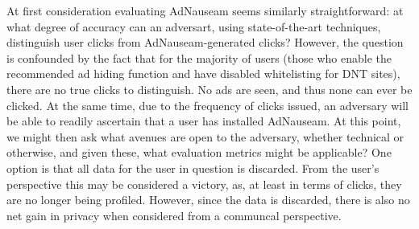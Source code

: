 \documentclass[conference]{IEEEtran}
\begin{document}
At first consideration evaluating AdNauseam seems similarly straightforward: at what degree of accuracy can an adversart, using state-of-the-art techniques, distinguish user clicks from AdNauseam-generated clicks? However, the question is confounded by the fact that for the majority of users (those who enable the recommended ad hiding function and have disabled whitelisting for DNT sites), there are no true clicks to distinguish. No ads are seen, and thus none can ever be clicked. At the same time, due to the frequency of clicks issued, an adversary will be able to readily ascertain that a user has installed AdNauseam. At this point, we might then ask what avenues are open to the adversary, whether technical or otherwise, and given these, what evaluation metrics might be applicable? One option is that all data for the user in question is discarded. From the user's perspective this may be considered a victory, as, at least in terms of clicks, they are no longer being profiled. However, since the data is discarded, there is also no net gain in privacy when considered from a communcal perspective.
\end{document}

